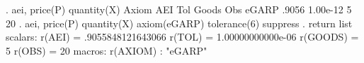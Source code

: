 . aei, price(P) quantity(X)
{\smallskip}
       Axiom {\VBAR}       AEI        Tol      Goods        Obs 
       eGARP {\VBAR}     .9056   1.00e-12          5         20 
{\smallskip}
. aei, price(P) quantity(X) axiom(eGARP) tolerance(6) suppress
{\smallskip}
. return list
{\smallskip}
scalars:
                r(AEI) =  .9055848121643066
                r(TOL) =  1.00000000000e-06
              r(GOODS) =  5
                r(OBS) =  20
{\smallskip}
macros:
              r(AXIOM) : "eGARP"
{\smallskip}
